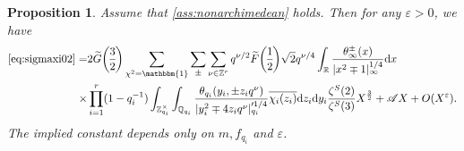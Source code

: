 \documentclass[10pt,oneside,reqno]{amsart}
\newcommand\rmd{\mathrm{d}}
\newcommand\QQ{\mathbb{Q}}
\newcommand\RR{\mathbb{R}}
\newcommand\ZZ{\mathbb{Z}}
\newcommand\ms[1]{\mathscr{#1}}
\newcommand\triv{\mathbbm{1}}
\newcommand\legendresymbol[2]{\genfrac{(}{)}{}{}{#1}{#2}}
\theoremstyle{THEOREM}
\newtheorem{proposition}[theorem]{Proposition}
\theoremstyle{DEFINITION}
\theoremstyle{EXERCISE}
\numberwithin{equation}{section}
\begin{document}
\begin{proposition}\label{prop:sigmaxi02}
Assume that \autoref{ass:nonarchimedean} holds. Then for any $\varepsilon>0$, we have 
\begin{align*}
\eqref{eq:sigmaxi02}=&2\widetilde{G}\legendresymbol{3}{2}\sum_{\chi^2=\triv}\sum_{\pm}\sum_{\nu\in \ZZ^r}q^{\nu/2}\widetilde{F}\legendresymbol{1}{2}\sqrt{2}q^{\nu/4} \int_{\RR}\frac{\theta_\infty^\pm(x)}{|x^2\mp 1|_\infty^{1/4}}\rmd x\\
\times&\prod_{i=1}^{r}(1-q_i^{-1})\int_{\ZZ_{q_i}^\times}\int_{\QQ_{q_i}}\frac{\theta_{q_i}(y_i,\pm z_i q^\nu)}{|y_i^2\mp 4z_iq^\nu|_{q_i}'^{1/4}}\overline{\chi_i(z_i)}\rmd z_i\rmd y_i \frac{\zeta^S(2)}{\zeta^S(3)}X^{\frac32}+\ms{A}X+O(X^\varepsilon).
\end{align*}
The implied constant depends only on $m,f_{q_i}$ and $\varepsilon$.
\end{proposition}
\end{document}
